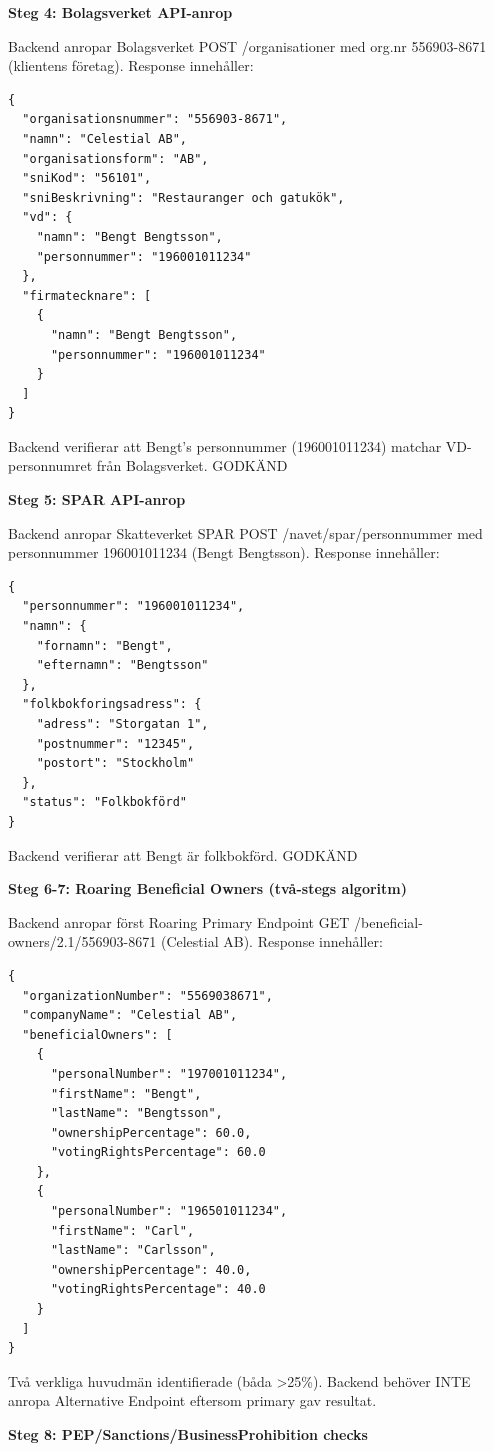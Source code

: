 \documentclass[12pt,a4paper]{article}
\begin{document}
\textbf{Steg 4: Bolagsverket API-anrop}

Backend anropar Bolagsverket POST /organisationer med org.nr 556903-8671 (klientens företag). Response innehåller:
\begin{lstlisting}
{
  "organisationsnummer": "556903-8671",
  "namn": "Celestial AB",
  "organisationsform": "AB",
  "sniKod": "56101",
  "sniBeskrivning": "Restauranger och gatukök",
  "vd": {
    "namn": "Bengt Bengtsson",
    "personnummer": "196001011234"
  },
  "firmatecknare": [
    {
      "namn": "Bengt Bengtsson",
      "personnummer": "196001011234"
    }
  ]
}
\end{lstlisting}

Backend verifierar att Bengt's personnummer (196001011234) matchar VD-personnumret från Bolagsverket. GODKÄND

\textbf{Steg 5: SPAR API-anrop}

Backend anropar Skatteverket SPAR POST /navet/spar/personnummer med personnummer 196001011234 (Bengt Bengtsson). Response innehåller:
\begin{lstlisting}
{
  "personnummer": "196001011234",
  "namn": {
    "fornamn": "Bengt",
    "efternamn": "Bengtsson"
  },
  "folkbokforingsadress": {
    "adress": "Storgatan 1",
    "postnummer": "12345",
    "postort": "Stockholm"
  },
  "status": "Folkbokförd"
}
\end{lstlisting}

Backend verifierar att Bengt är folkbokförd. GODKÄND

\textbf{Steg 6-7: Roaring Beneficial Owners (två-stegs algoritm)}

Backend anropar först Roaring Primary Endpoint GET /beneficial-owners/2.1/556903-8671 (Celestial AB). Response innehåller:
\begin{lstlisting}
{
  "organizationNumber": "5569038671",
  "companyName": "Celestial AB",
  "beneficialOwners": [
    {
      "personalNumber": "197001011234",
      "firstName": "Bengt",
      "lastName": "Bengtsson",
      "ownershipPercentage": 60.0,
      "votingRightsPercentage": 60.0
    },
    {
      "personalNumber": "196501011234",
      "firstName": "Carl",
      "lastName": "Carlsson",
      "ownershipPercentage": 40.0,
      "votingRightsPercentage": 40.0
    }
  ]
}
\end{lstlisting}

Två verkliga huvudmän identifierade (båda >25\%). Backend behöver INTE anropa Alternative Endpoint eftersom primary gav resultat.

\textbf{Steg 8: PEP/Sanctions/BusinessProhibition checks}
\end{document}

